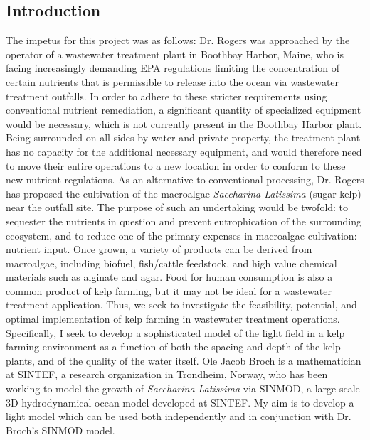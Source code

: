 \documentclass[10pt]{article}
\begin{document}
\begin{multicols}{2}

\section{Introduction}
The impetus for this project was as follows: Dr. Rogers was approached by the operator of a wastewater treatment plant in Boothbay Harbor, Maine, who is facing increasingly demanding EPA regulations limiting the concentration of certain nutrients that is permissible to release into the ocean via wastewater treatment outfalls.
In order to adhere to these stricter requirements using conventional nutrient remediation, a significant quantity of specialized equipment would be necessary, which is not currently present in the Boothbay Harbor plant.
Being surrounded on all sides by water and private property, the treatment plant has no capacity for the additional necessary equipment, and would therefore need to move their entire operations to a new location in order to conform to these new nutrient regulations.
	As an alternative to conventional processing, Dr. Rogers has proposed the cultivation of the macroalgae \textit{Saccharina Latissima} (sugar kelp) near the outfall site.
The purpose of such an undertaking would be twofold: to sequester the nutrients in question and prevent eutrophication of the surrounding ecosystem, and to reduce one of the primary expenses in macroalgae cultivation: nutrient input.
Once grown, a variety of products can be derived from macroalgae, including biofuel, fish/cattle feedstock, and high value chemical materials such as alginate and agar.
Food for human consumption is also a common product of kelp farming, but it may not be ideal for a wastewater treatment application.
Thus, we seek to investigate the feasibility, potential, and optimal implementation of kelp farming in wastewater treatment operations. 
Specifically, I seek to develop a sophisticated model of the light field in a kelp farming environment as a function of both the spacing and depth of the kelp plants, and of the quality of the water itself.
Ole Jacob Broch is a mathematician at SINTEF, a research organization in Trondheim, Norway, who has been working to model the growth of \textit{Saccharina Latissima} via SINMOD, a large-scale 3D hydrodynamical ocean model developed at SINTEF.
My aim is to develop a light model which can be used both independently and in conjunction with Dr. Broch's SINMOD model.


\end{multicols}
\end{document}
